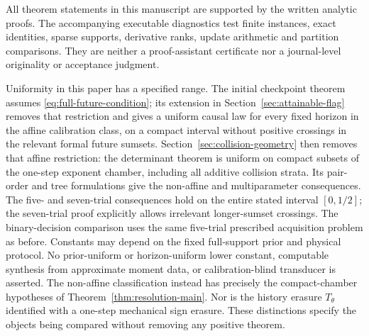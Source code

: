 All theorem statements in this manuscript are supported by the written
analytic proofs. The accompanying executable diagnostics test finite
instances, exact identities, sparse supports, derivative ranks, update
arithmetic and partition comparisons. They are neither a proof-assistant
certificate nor a journal-level originality or acceptance judgment.

Uniformity in this paper has a specified range. The initial checkpoint
theorem assumes \eqref{eq:full-future-condition}; its extension in
Section~\ref{sec:attainable-flag} removes that restriction and gives a
uniform causal law for every fixed horizon in the affine calibration
class, on a compact interval without positive crossings in the relevant
formal future sumsets. Section~\ref{sec:collision-geometry} then removes
that affine restriction: the determinant theorem is uniform on compact
subsets of the one-step exponent chamber, including all additive
collision strata. Its pair-order and tree formulations give the
non-affine and multiparameter consequences. The five- and seven-trial consequences hold on
the entire stated interval $[0,1/2]$; the seven-trial proof explicitly
allows irrelevant longer-sumset crossings. The binary-decision comparison
uses the same five-trial prescribed acquisition problem as before.
Constants may depend on the fixed full-support prior and physical
protocol. No prior-uniform or horizon-uniform lower constant, computable
synthesis from approximate moment data, or calibration-blind transducer
is asserted. The non-affine classification instead has precisely the
compact-chamber hypotheses of Theorem~\ref{thm:resolution-main}. Nor is the history erasure $T_\theta$
identified with a one-step mechanical sign erasure. These distinctions
specify the objects being compared without removing any positive theorem.
